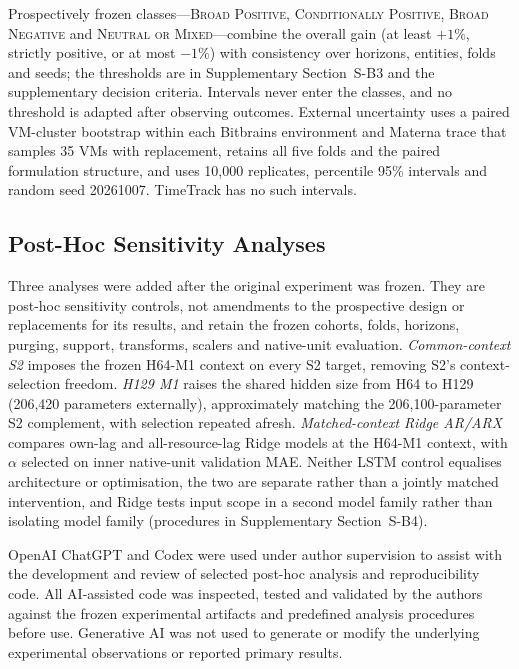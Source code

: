 \documentclass[5p,twocolumn]{elsarticle}
\begin{document}
Prospectively frozen classes---\textsc{Broad Positive},
\textsc{Conditionally Positive}, \textsc{Broad Negative} and
\textsc{Neutral or Mixed}---combine the overall gain (at least $+1\%$,
strictly positive, or at most $-1\%$) with consistency over horizons,
entities, folds and seeds; the thresholds are in Supplementary
Section~S-B3 and the supplementary decision criteria. Intervals never enter
the classes, and no threshold is adapted after observing outcomes. External
uncertainty uses a paired VM-cluster bootstrap within each Bitbrains
environment and Materna trace that samples 35 VMs with replacement, retains
all five folds and the paired formulation structure, and uses 10,000
replicates, percentile 95\% intervals and random seed 20261007. TimeTrack has
no such intervals.

\subsection{Post-Hoc Sensitivity Analyses}
\label{sec:posthoc-controls}

Three analyses were added after the original experiment was frozen. They are
post-hoc sensitivity controls, not amendments to the prospective design or
replacements for its results, and retain the frozen cohorts, folds, horizons,
purging, support, transforms, scalers and native-unit evaluation.
\emph{Common-context S2} imposes the frozen H64-M1 context on every S2 target,
removing S2's context-selection freedom. \emph{H129 M1} raises the shared
hidden size from H64 to H129 (206,420 parameters externally), approximately
matching the 206,100-parameter S2 complement, with selection repeated afresh.
\emph{Matched-context Ridge AR/ARX} compares own-lag and all-resource-lag
Ridge models at the H64-M1 context, with $\alpha$ selected on inner
native-unit validation MAE. Neither LSTM control equalises architecture or
optimisation, the two are separate rather than a jointly matched
intervention, and Ridge tests input scope in a second model family rather
than isolating model family (procedures in Supplementary Section~S-B4).

OpenAI ChatGPT and Codex were used under author supervision to assist with the
development and review of selected post-hoc analysis and reproducibility code.
All AI-assisted code was inspected, tested and validated by the authors against
the frozen experimental artifacts and predefined analysis procedures before
use. Generative AI was not used to generate or modify the underlying
experimental observations or reported primary results.
\end{document}
